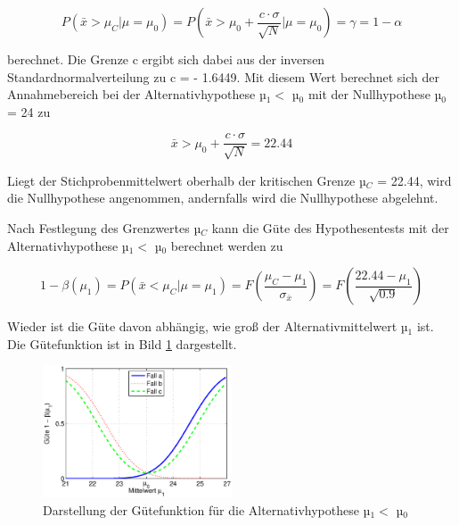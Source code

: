 \begin{equation}\label{eq:sixsixtyeight}
P\left(\bar{x}>\mu _{C} |\mu =\mu _{0} \right)=P\left(\bar{x}>\mu _{0} +\dfrac{c\cdot \sigma }{\sqrt{N} } |\mu =\mu _{0} \right)=\gamma =1-\alpha
\end{equation}

\noindent berechnet. Die Grenze c ergibt sich dabei aus der inversen Standardnormalverteilung zu c = - 1.6449. Mit diesem Wert berechnet sich der Annahmebereich bei der Alternativhypothese µ$_{1} <$ µ$_{0}$ mit der Nullhypothese µ$_{0}$ = 24 zu

\begin{equation}\label{eq:sixsixtynine}
\bar{x}>\mu _{0} +\dfrac{c\cdot \sigma }{\sqrt{N} } =22.44
\end{equation}

\noindent Liegt der Stichprobenmittelwert oberhalb der kritischen Grenze µ$_{C}$ = 22.44, wird die Nullhypothese angenommen, andernfalls wird die Nullhypothese abgelehnt.\newline

\noindent Nach Festlegung des Grenzwertes µ$_{C}$ kann die G\"{u}te des Hypothesentests mit der Alternativhypothese µ$_{1} <$ µ$_{0}$ berechnet werden zu

\begin{equation}\label{eq:sixseventy}
1-\beta (\mu _{1})=P\left(\bar{x}<\mu _{C} |\mu =\mu _{1} \right)=F\left(\dfrac{\mu _{C} -\mu _{1}}{\sigma _{\bar{x}}} \right)=F\left(\dfrac{22.44-\mu _{1}}{\sqrt{0.9} } \right)
\end{equation}

\noindent Wieder ist die G\"{u}te davon abh\"{a}ngig, wie gro{\ss} der Alternativmittelwert µ$_{1}$ ist. Die G\"{u}tefunktion ist in Bild \ref{fig:HypothesentestFehler2} dargestellt.

\noindent 
\begin{figure}[H]
  \centerline{\includegraphics[width=0.5\textwidth]{Kapitel6/Bilder/image11}}
  \caption{Darstellung der G\"{u}tefunktion f\"{u}r die Alternativhypothese µ$_{1} <$ µ$_{0}$}
  \label{fig:HypothesentestFehler2}
\end{figure}

